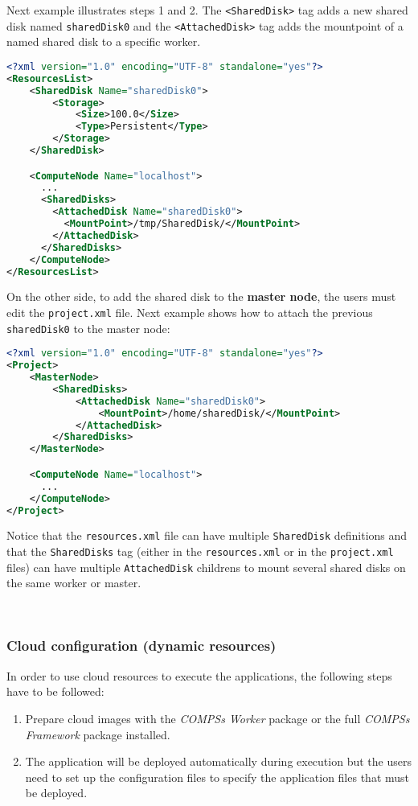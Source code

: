 Next example illustrates steps 1 and 2. The \texttt{<SharedDisk>} tag adds a new shared disk named \texttt{sharedDisk0} and the
\texttt{<AttachedDisk>} tag adds the mountpoint of a named shared disk to a specific worker.
\begin{lstlisting}[language=xml]
<?xml version="1.0" encoding="UTF-8" standalone="yes"?>
<ResourcesList>
    <SharedDisk Name="sharedDisk0">
        <Storage>
            <Size>100.0</Size>
            <Type>Persistent</Type>
        </Storage>
    </SharedDisk>

    <ComputeNode Name="localhost">
      ...
      <SharedDisks>
        <AttachedDisk Name="sharedDisk0">
          <MountPoint>/tmp/SharedDisk/</MountPoint>
        </AttachedDisk>
      </SharedDisks>
    </ComputeNode>
</ResourcesList>
\end{lstlisting}

On the other side, to add the shared disk to the \textbf{master node}, the users must edit the \texttt{project.xml} file. Next example
shows how to attach the previous \texttt{sharedDisk0} to the master node:

\newpage

\begin{lstlisting}[language=xml]
<?xml version="1.0" encoding="UTF-8" standalone="yes"?>
<Project>
    <MasterNode>
        <SharedDisks>
            <AttachedDisk Name="sharedDisk0">
                <MountPoint>/home/sharedDisk/</MountPoint>
            </AttachedDisk>
        </SharedDisks>
    </MasterNode>

    <ComputeNode Name="localhost">
      ...
    </ComputeNode>
</Project>
\end{lstlisting}

Notice that the \texttt{resources.xml} file can have multiple \texttt{SharedDisk} definitions and that the \texttt{SharedDisks}
tag (either in the \texttt{resources.xml} or in the \texttt{project.xml} files) can have multiple \texttt{AttachedDisk} childrens
to mount several shared disks on the same worker or master.

~ \newline

\subsubsection{Cloud configuration (dynamic resources)}
In order to use cloud resources to execute the applications, the following steps have to be followed:
\begin{enumerate}
 \item Prepare cloud images with the \textit{COMPSs Worker} package or the full \textit{COMPSs Framework} package installed.
 \item The application will be deployed automatically during execution but the users need to set up the configuration files to
 specify the application files that must be deployed.
\end{enumerate}

